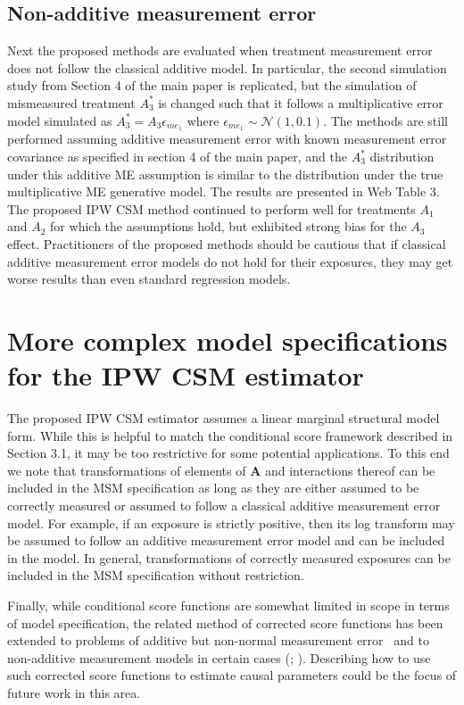 \documentclass[12pt]{article}
\begin{document}
\subsection{Non-additive measurement error}

Next the proposed methods are evaluated when treatment measurement error does not follow the classical additive model. In particular, the second simulation study from Section 4 of the main paper is replicated, but the simulation of mismeasured treatment $A^{*}_{3}$ is changed such that it follows a multiplicative error model simulated as $A_{3}^{*} = A_{3} \epsilon_{me_{1}}$ where $\epsilon_{me_{1}} \sim \mathcal{N}(1, 0.1)$. The methods are still performed assuming additive measurement error with known measurement error covariance as specified in section 4 of the main paper, and the $A^{*}_{3}$ distribution under this additive ME assumption is similar to the distribution under the true multiplicative ME generative model. The results are presented in Web Table 3. The proposed IPW CSM method continued to perform well for treatments $A_{1}$ and $A_{2}$ for which the assumptions hold, but exhibited strong bias for the $A_{3}$ effect. Practitioners of the proposed methods should be cautious that if classical additive measurement error models do not hold for their exposures, they may get worse results than even standard regression models.

\section{More complex model specifications for the IPW CSM estimator}

The proposed IPW CSM estimator assumes a linear marginal structural model form. While this is helpful to match the conditional score framework described in Section 3.1, it may be too restrictive for some potential applications. To this end we note that transformations of elements of $\bm{A}$ and interactions thereof can be included in the MSM specification as long as they are either assumed to be correctly measured or assumed to follow a classical additive measurement error model. For example, if an exposure is strictly positive, then its log transform may be assumed to follow an additive measurement error model and can be included in the model. In general, transformations of correctly measured exposures can be included in the MSM specification without restriction.

Finally, while conditional score functions are somewhat limited in scope in terms of model specification, the related method of corrected score functions has been extended to problems of additive but non-normal measurement error~\citep{buzas1996} and to non-additive measurement models in certain cases (\citealp{nakamura1990}; \citealp*{li2004}). Describing how to use such corrected score functions to estimate causal parameters could be the focus of future work in this area.
\end{document}

